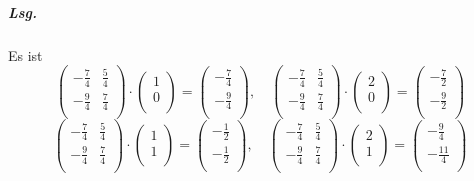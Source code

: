 \documentclass{scrreprt}
\begin{document}
\begin{enumerate}[(a)]
  \subparagraph{Lsg.} Es ist
  \[
    \begin{pmatrix}
      -\frac{7}{4}  & \frac{5}{4} \\
      -\frac{9}{4} & \frac{7}{4} \\
    \end{pmatrix} \cdot \begin{pmatrix}
      1 \\
      0 \\
    \end{pmatrix} = \begin{pmatrix}
      -\frac{7}{4} \\
      -\frac{9}{4} \\
    \end{pmatrix}, \quad
    \begin{pmatrix}
      -\frac{7}{4}  & \frac{5}{4} \\
      -\frac{9}{4} & \frac{7}{4} \\
    \end{pmatrix} \cdot \begin{pmatrix}
      2 \\
      0 \\
    \end{pmatrix} = \begin{pmatrix}
      -\frac{7}{2} \\
      -\frac{9}{2} \\
    \end{pmatrix}
  \]
  \[
    \begin{pmatrix}
      -\frac{7}{4}  & \frac{5}{4} \\
      -\frac{9}{4} & \frac{7}{4} \\
    \end{pmatrix} \cdot \begin{pmatrix}
      1 \\
      1 \\
    \end{pmatrix} = \begin{pmatrix}
      -\frac{1}{2} \\
      -\frac{1}{2} \\
    \end{pmatrix}, \quad
    \begin{pmatrix}
      -\frac{7}{4}  & \frac{5}{4} \\
      -\frac{9}{4} & \frac{7}{4} \\
    \end{pmatrix} \cdot \begin{pmatrix}
      2 \\
      1 \\
    \end{pmatrix} = \begin{pmatrix}
      -\frac{9}{4} \\
      -\frac{11}{4} \\
    \end{pmatrix}
  \]


\end{enumerate}
\end{document}
